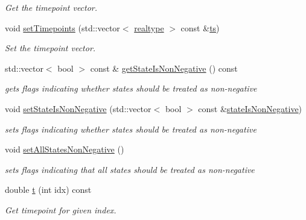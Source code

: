 \begin{DoxyCompactItemize}
\begin{DoxyCompactList}\small\item\em Get the timepoint vector. \end{DoxyCompactList}\item 
void \mbox{\hyperlink{classamici_1_1_model_a50f9642f9bcb883dbd3925c85abc4c24}{set\+Timepoints}} (std\+::vector$<$ \mbox{\hyperlink{namespaceamici_a1bdce28051d6a53868f7ccbf5f2c14a3}{realtype}} $>$ const \&\mbox{\hyperlink{classamici_1_1_model_aa7014a80e7b102f85a10e3b9a480e8e5}{ts}})
\begin{DoxyCompactList}\small\item\em Set the timepoint vector. \end{DoxyCompactList}\item 
std\+::vector$<$ bool $>$ const  \& \mbox{\hyperlink{classamici_1_1_model_a25b1fc032e0065d80d8bd1041ab84bbf}{get\+State\+Is\+Non\+Negative}} () const
\begin{DoxyCompactList}\small\item\em gets flags indicating whether states should be treated as non-\/negative \end{DoxyCompactList}\item 
void \mbox{\hyperlink{classamici_1_1_model_a0a50693322a9383d8e98390d9894e841}{set\+State\+Is\+Non\+Negative}} (std\+::vector$<$ bool $>$ const \&\mbox{\hyperlink{classamici_1_1_model_a30f9edd35aad3ccaba31f67331881da5}{state\+Is\+Non\+Negative}})
\begin{DoxyCompactList}\small\item\em sets flags indicating whether states should be treated as non-\/negative \end{DoxyCompactList}\item 
\mbox{\label{classamici_1_1_model_aa7e0ea3a94ef60800aa3fb532f11e97f}} 
void \mbox{\hyperlink{classamici_1_1_model_aa7e0ea3a94ef60800aa3fb532f11e97f}{set\+All\+States\+Non\+Negative}} ()
\begin{DoxyCompactList}\small\item\em sets flags indicating that all states should be treated as non-\/negative \end{DoxyCompactList}\item 
double \mbox{\hyperlink{classamici_1_1_model_a711281d57e9710226face29151cc4641}{t}} (int idx) const
\begin{DoxyCompactList}\small\item\em Get timepoint for given index. \end{DoxyCompactList}\item 

\end{DoxyCompactItemize}
